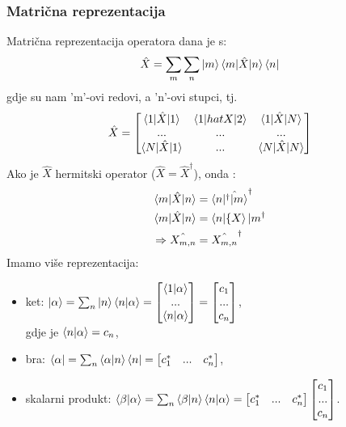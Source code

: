\documentclass{article}
\numberwithin{equation}{section}
\begin{document}
\subsubsection{Matrična reprezentacija}
Matrična reprezentacija operatora dana je s:
\begin{equation}
	\hat{X} = \sum_m\sum_n \ket{m}\braket{m|\hat{X}|n}\bra{n}
\end{equation}
gdje su nam 'm'-ovi redovi, a 'n'-ovi stupci, tj.
\begin{equation}
	\hat{X} = 
\begin{bmatrix}
	\braket{1|\hat{X}|1} & \braket{1|hat{X}|2} & \braket{1|\hat{X}|N}\\
	... & ... & ...\\
	\braket{N|\hat{X}|1}& ...& \braket{N|\hat{X}|N}
\end{bmatrix}
\end{equation}
Ako je $\hat{X}$ hermitski operator ($\hat{X} = \hat{X}^{\dagger}$), onda :
\begin{equation}
	\begin{aligned}
		\braket{m|\hat{X}|n} &= \braket{n|\hat{^{\dagger}|m}}^{\dagger}\\
		\braket{m|\hat{X}|n} &= \braket{n|\{X}|m^{\dagger}\\
			\Rightarrow \hat{X_{m,n}} &= \hat{X_{m,n}}^{\dagger}
	\end{aligned}
\end{equation}
Imamo više reprezentacija:
\begin{itemize}
	\item ket: $\ket{\alpha} = \sum_n\ket{n}\braket{n|\alpha} =
				\begin{bmatrix} \braket{1|\alpha}\\ ...\\ \braket{n|\alpha} \end{bmatrix} 
				= \begin{bmatrix} c_1\\ ...\\ c_n  \end{bmatrix}$,\\
				gdje je $\braket{n|\alpha} = c_n$,
	\item bra: $\bra{\alpha} = \sum_n \braket{\alpha|n}\bra{n} = \begin{bmatrix} c_1^* & ... & c_n^* \end{bmatrix}$,
	\item skalarni produkt: $\braket{\beta|\alpha} = \sum_n \braket{\beta|n}\braket{n|\alpha}=
				\begin{bmatrix} c_1^* & ... & c_n^* \end{bmatrix} \begin{bmatrix} c_1\\ ...\\ c_n  \end{bmatrix}$.
\end{itemize}
\newpage
\end{document}
